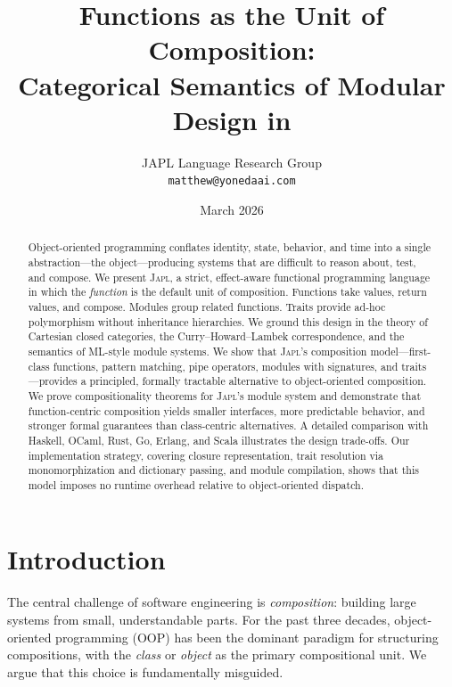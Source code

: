 \documentclass[11pt,a4paper]{article}
\title{Functions as the Unit of Composition: \\
Categorical Semantics of Modular Design in \japl{}}
\author{
  JAPL Language Research Group \\
  \texttt{matthew@yonedaai.com}
}
\date{March 2026}
\newcommand{\japl}{\textsc{Japl}}
\begin{document}
\maketitle

\begin{abstract}
Object-oriented programming conflates identity, state, behavior, and time into a single abstraction---the object---producing systems that are difficult to reason about, test, and compose. We present \japl{}, a strict, effect-aware functional programming language in which the \emph{function} is the default unit of composition. Functions take values, return values, and compose. Modules group related functions. Traits provide ad-hoc polymorphism without inheritance hierarchies. We ground this design in the theory of Cartesian closed categories, the Curry--Howard--Lambek correspondence, and the semantics of ML-style module systems. We show that \japl{}'s composition model---first-class functions, pattern matching, pipe operators, modules with signatures, and traits---provides a principled, formally tractable alternative to object-oriented composition. We prove compositionality theorems for \japl{}'s module system and demonstrate that function-centric composition yields smaller interfaces, more predictable behavior, and stronger formal guarantees than class-centric alternatives. A detailed comparison with Haskell, OCaml, Rust, Go, Erlang, and Scala illustrates the design trade-offs. Our implementation strategy, covering closure representation, trait resolution via monomorphization and dictionary passing, and module compilation, shows that this model imposes no runtime overhead relative to object-oriented dispatch.
\end{abstract}

\section{Introduction}
\label{sec:introduction}

The central challenge of software engineering is \emph{composition}: building large systems from small, understandable parts. For the past three decades, object-oriented programming (OOP) has been the dominant paradigm for structuring compositions, with the \emph{class} or \emph{object} as the primary compositional unit. We argue that this choice is fundamentally misguided.
\end{document}

